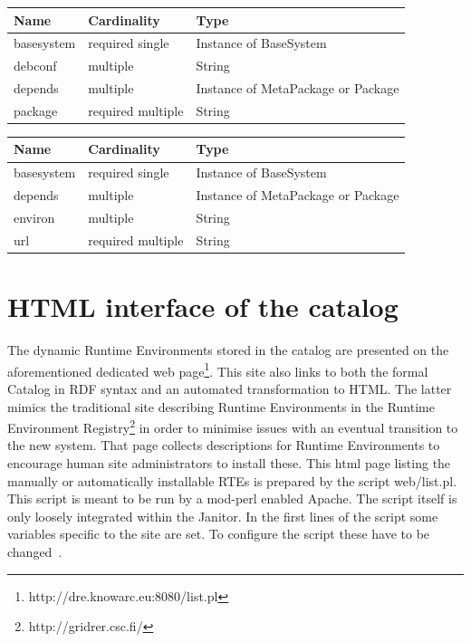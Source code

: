 \begin{table}[!h]
   \begin{center}
         \label{tab:main_class_debian}
	\begin{tabular}{p{3cm}p{3cm}p{6cm}}
	\textbf{Name}  & \textbf{Cardinality}  & \textbf{Type}\\
	\hline
	basesystem     & required single       & Instance of BaseSystem       \\
	debconf        & multiple              & String       \\
	depends        & multiple              & Instance of MetaPackage  or Package      \\
	package        & required multiple              & String      \\
	\end{tabular} 
   \end{center}
\end{table}

\begin{table}[!h]
   \begin{center}
         \label{tab:main_class_tar}
	\begin{tabular}{p{3cm}p{3cm}p{6cm}}
	\textbf{Name}  & \textbf{Cardinality}  & \textbf{Type}\\
	\hline
	basesystem     & required single       & Instance of BaseSystem       \\
	depends        & multiple              & Instance of MetaPackage or Package      \\
	environ        & multiple              & String       \\
	url            & required multiple     & String      \\
	\end{tabular} 
   \end{center}
\end{table}

\section{HTML interface of the catalog}

The dynamic Runtime Environments stored in the catalog are presented on the aforementioned dedicated web
page\footnote{http://dre.knowarc.eu:8080/list.pl}. This site also links to both the formal Catalog in 
RDF syntax and an automated transformation to
HTML. The latter mimics the traditional site describing Runtime Environments in the Runtime Environment
Registry\footnote{http://gridrer.csc.fi/} in order to minimise issues with an eventual transition to the new system. 
That page collects descriptions for Runtime Environments to encourage human site administrators to install these.
This html page listing the manually or automatically installable RTEs is prepared by the script web/list.pl.
This script is meant to be run by a mod-perl enabled Apache. The script itself is only loosely integrated
within the Janitor. In the first lines of the script some variables specific to the site are set. To configure the
script these have to be changed~\cite[p. 9]{BAYER_2007}.




